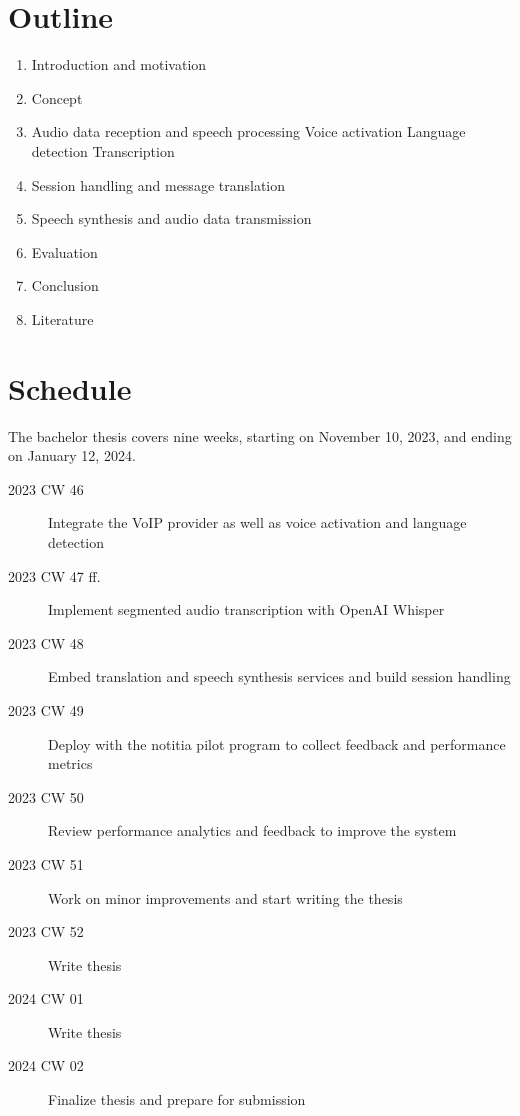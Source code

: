 \documentclass[a4paper,10pt]{article}
\begin{document}
\section{Outline}
\begin{enumerate}
  \item Introduction and motivation
  \item Concept
  \item Audio data reception and speech processing
  \subitem Voice activation
  \subitem Language detection
  \subitem Transcription
  \item Session handling and message translation
  \item Speech synthesis and audio data transmission
  \item Evaluation
  \item Conclusion
  \item Literature
\end{enumerate}


\section{Schedule}
The bachelor thesis covers nine weeks, starting on November 10, 2023, and ending on January 12, 2024.
\begin{description}
  \item[2023 CW 46] Integrate the VoIP provider as well as voice activation and language detection
  \item[2023 CW 47 ff.] Implement segmented audio transcription with OpenAI Whisper
  \item[2023 CW 48] Embed translation and speech synthesis services and build session handling
  \item[2023 CW 49] Deploy with the notitia pilot program to collect feedback and performance metrics
  \item[2023 CW 50] Review performance analytics and feedback to improve the system
  \item[2023 CW 51] Work on minor improvements and start writing the thesis
  \item[2023 CW 52] Write thesis
  \item[2024 CW 01] Write thesis
  \item[2024 CW 02] Finalize thesis and prepare for submission
\end{description}


% 
% 
\end{document}
